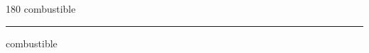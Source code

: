 
\begin{frame}
\begin{center}
\begin{turn}{180}
{\fontsize{2.5cm}{1em}\selectfont combustible}
\end{turn}
\vspace{1em}\par  
\hrule
\vspace{1em}\par  
{\fontsize{2.5cm}{1em}\selectfont combustible}
\end{center}
\end{frame}
